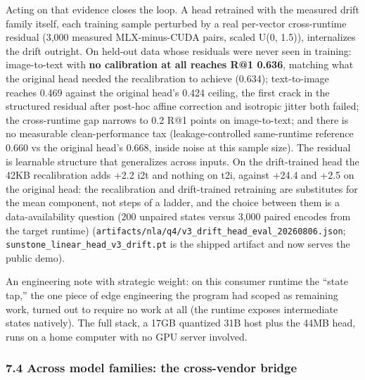 \documentclass[
  11pt,
]{article}
\begin{document}
Acting on that evidence closes the loop. A head retrained with the
measured drift family itself, each training sample perturbed by a real
per-vector cross-runtime residual (3,000 measured MLX-minus-CUDA pairs,
scaled U(0, 1.5)), internalizes the drift outright. On held-out data
whose residuals were never seen in training: image-to-text with
\textbf{no calibration at all reaches R@1 0.636}, matching what the
original head needed the recalibration to achieve (0.634); text-to-image
reaches 0.469 against the original head's 0.424 ceiling, the first crack
in the structured residual after post-hoc affine correction and
isotropic jitter both failed; the cross-runtime gap narrows to 0.2 R@1
points on image-to-text; and there is no measurable clean-performance
tax (leakage-controlled same-runtime reference 0.660 vs the original
head's 0.668, inside noise at this sample size). The residual is
learnable structure that generalizes across inputs. On the drift-trained
head the 42KB recalibration adds +2.2 i2t and nothing on t2i, against
+24.4 and +2.5 on the original head: the recalibration and drift-trained
retraining are substitutes for the mean component, not steps of a
ladder, and the choice between them is a data-availability question (200
unpaired states versus 3,000 paired encodes from the target runtime)
(\texttt{artifacts/nla/q4/v3\_drift\_head\_eval\_20260806.json};
\texttt{sunstone\_linear\_head\_v3\_drift.pt} is the shipped artifact
and now serves the public demo).

An engineering note with strategic weight: on this consumer runtime the
``state tap,'' the one piece of edge engineering the program had scoped
as remaining work, turned out to require no work at all (the runtime
exposes intermediate states natively). The full stack, a 17GB quantized
31B host plus the 44MB head, runs on a home computer with no GPU server
involved.

\subsubsection{7.4 Across model families: the cross-vendor
bridge}\label{across-model-families-the-cross-vendor-bridge}
\end{document}
